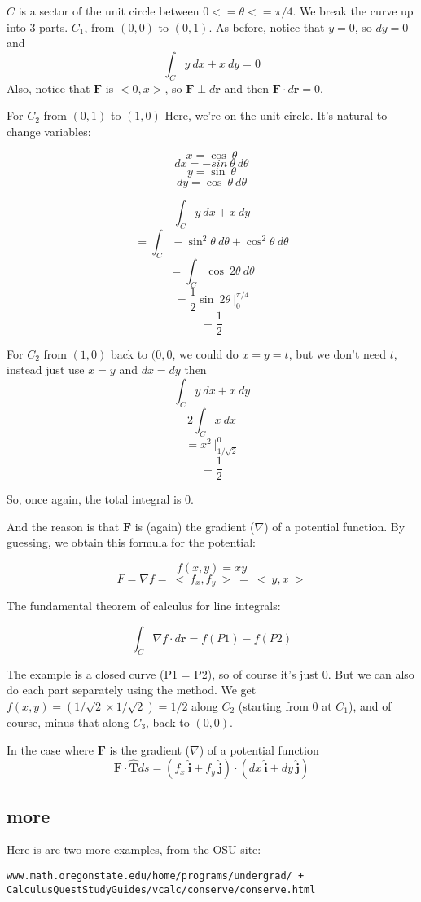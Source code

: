 \documentclass[11pt, oneside]{article}   	%
\begin{document}
$C$ is a sector of the unit circle between $0 <= \theta <= \pi/4$.  We break the curve up into 3 parts.
$C_1$, from $(0,0)$ to $(0,1)$.  As before, notice that $y=0$, so $dy=0$ and 
\[ \int_C y \ dx + x \ dy = 0 \]
Also, notice that $\mathbf{F}$ is $<0,x>$, so $\mathbf{F} \perp d\mathbf{r}$ and then  $\mathbf{F} \cdot d\mathbf{r} = 0$.

For $C_2$ from $(0,1)$ to $(1,0)$  Here, we're on the unit circle.  It's natural to change variables:

\[ x = \cos \ \theta \]
\[ dx = -sin \ \theta \ d \theta \]
\[ y = \sin \ \theta \]
\[ dy = \cos \ \theta \ d \theta \]

\[ \int_C y \ dx + x \ dy  \]
\[ = \int_C -\sin^2 \theta \ d \theta + \cos^2 \theta \ d \theta \]
\[ = \int_C \cos \ 2 \theta \ d \theta \]
\[ = \frac{1}{2} \sin \ 2 \theta \ \bigg|_0^{\pi/4} \]
\[ = \frac{1}{2} \]

For $C_2$ from $(1,0)$ back to $(0,0$, we could do $x=y=t$, but we don't need $t$, instead just use $x=y$ and $dx=dy$ then
\[ \int_C y \ dx + x \ dy  \]
\[ 2 \int_C x \ dx \]
\[ = x^2  \ \bigg|_{1/\sqrt{2}}^0 \]
\[ = \frac{1}{2} \]

So, once again, the total integral is $0$.

And the reason is that $\mathbf{F}$ is (again) the gradient ($\nabla$) of a potential function.  By guessing, we obtain this formula for the potential:

\[ f(x,y) = xy \]
\[ F = \nabla f = \ < \ f_x,f_y \ > \ = \ < \ y,x \ > \]

The fundamental theorem of calculus for line integrals:

 \[ \int_C \nabla f \cdot d \mathbf{r} =   f(P1) - f(P2) \]
  
The example is a closed curve (P1 = P2), so of course it's just 0.  But we can also do each part separately using the method.  We get $f(x,y) = (1/\sqrt{2} \times 1/\sqrt{2}) = 1/2$ along $C_2$ (starting from $0$ at $C_1$), and of course, minus that along $C_3$, back to $(0,0)$.

In the case where $\mathbf{F}$ is the gradient ($\nabla$) of a potential function
\[ \mathbf{F} \cdot \hat{\mathbf{T}} ds = (f_x \ \hat{\mathbf{i}} + f_y \ \hat{\mathbf{j}}) \cdot (dx \ \hat{\mathbf{i}} + dy \ \hat{\mathbf{j}} ) \]

\subsection*{more}
Here is are two more examples, from the OSU site:
\begin{verbatim}
www.math.oregonstate.edu/home/programs/undergrad/ +
CalculusQuestStudyGuides/vcalc/conserve/conserve.html
\end{verbatim}
\end{document}
